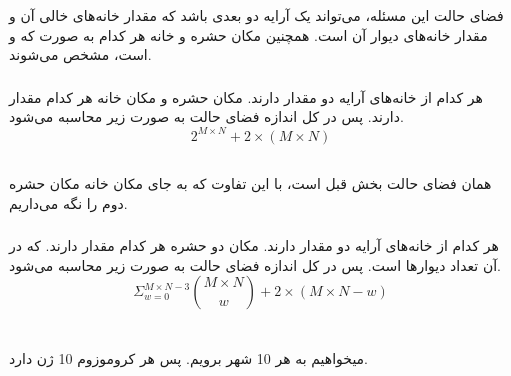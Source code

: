 \documentclass{university}
\begin{document}
\setupdocument

\section{}
\subsection{}
\subsubsection{}
فضای حالت این مسئله، می‌تواند یک آرایه دو بعدی 
باشد که مقدار خانه‌های خالی آن 
و مقدار خانه‌های دیوار آن 
است. همچنین مکان حشره و خانه 
هر کدام به صورت 
که 
و
است، مشخص می‌شوند. 

\subsubsection{}
هر کدام از خانه‌های آرایه دو مقدار دارند.
مکان حشره و مکان خانه
هر کدام 
مقدار دارند. پس در کل اندازه فضای حالت به صورت زیر محاسبه می‌شود. 
$$
2^{M \times N} + 2 \times (M \times N)
$$

\subsection{}
\subsubsection{}
همان فضای حالت بخش قبل است، با این تفاوت که به جای مکان خانه 
مکان حشره دوم را نگه می‌داریم.

\subsubsection{}
هر کدام از خانه‌های آرایه دو مقدار دارند.
مکان دو حشره هر کدام 
مقدار دارند. که در آن 
تعداد دیوارها است. پس در کل اندازه فضای حالت به صورت زیر محاسبه می‌شود. 
$$
\Sigma_{w = 0}^{M \times N - 3} \binom{M \times N}{w} + 2 \times (M \times N - w)
$$

\section{}
\subsection{}
میخواهیم به هر 10 شهر برویم. پس هر کروموزوم 10 ژن دارد.
\end{document}
